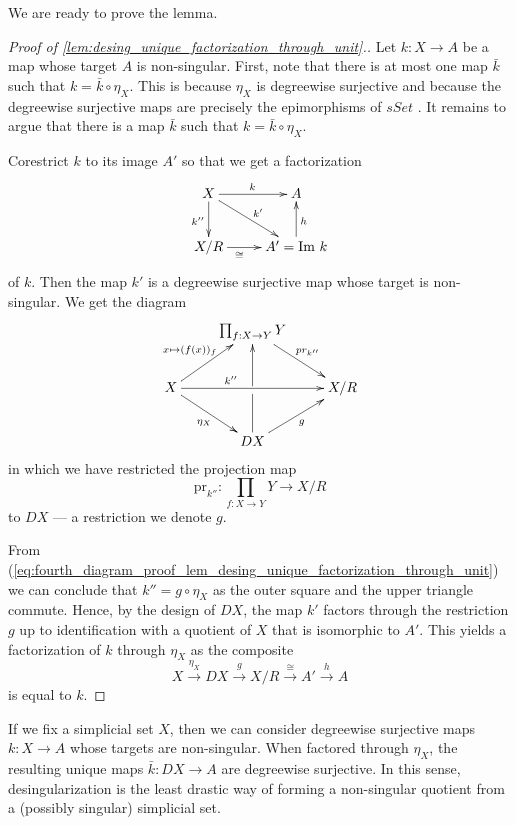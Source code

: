 We are ready to prove the lemma.
\begin{proof}[Proof of \cref{lem:desing_unique_factorization_through_unit}.]
Let $k:X\to A$ be a map whose target $A$ is non-singular. First, note that there is at most one map $\bar{k}$ such that $k=\bar{k} \circ \eta _X$. This is because $\eta _X$ is degreewise surjective and because the degreewise surjective maps are precisely the epimorphisms of $sSet$ \cite[p.~142]{FP90}. It remains to argue that there is a map $\bar{k}$ such that $k=\bar{k} \circ \eta _X$.

Corestrict $k$ to its image $A'$ so that we get a factorization
\begin{displaymath}
 \xymatrix{
 X \ar[d]_{k''} \ar[dr]^{k'} \ar[r]^k & A \\
 X/R \ar[r]_(.35)\cong & A'=\textrm{Im } k \ar[u]_h
 }
\end{displaymath}
of $k$. Then the map $k'$ is a degreewise surjective map whose target is non-singular. We get the diagram
\begin{equation}
\label{eq:fourth_diagram_proof_lem_desing_unique_factorization_through_unit}
\begin{gathered}
\xymatrix{
& \prod _{f:X\rightarrow Y}Y \ar[dr]^{pr_{k''}} \\
X \ar[ur]^{x\mapsto (f(x))_f} \ar[dr]_{\eta _X} \ar[rr]^(.35){k''} & \ar[u] & X/R \\
& DX \ar@{-}[u] \ar[ur]_g
}
\end{gathered}
\end{equation}
in which we have restricted the projection map
\[\textrm{pr} _{k''}:\prod _{f:X\rightarrow Y}Y\to X/R\]
to $DX$ --- a restriction we denote $g$.

From (\ref{eq:fourth_diagram_proof_lem_desing_unique_factorization_through_unit}) we can conclude that $k''=g\circ \eta _X$ as the outer square and the upper triangle commute. Hence, by the design of $DX$, the map $k'$ factors through the restriction $g$ up to identification with a quotient of $X$ that is isomorphic to $A'$. This yields a factorization of $k$ through $\eta _X$ as the composite
\[X\xrightarrow{\eta _X} DX\xrightarrow{g} X/R\xrightarrow{\cong } A'\xrightarrow{h} A\]
is equal to $k$.
\end{proof}
\noindent If we fix a simplicial set $X$, then we can consider degreewise surjective maps $k:X\to A$ whose targets are non-singular. When factored through $\eta _X$, the resulting unique maps $\bar{k} :DX\to A$ are degreewise surjective. In this sense, desingularization is the least drastic way of forming a non-singular quotient from a (possibly singular) simplicial set.


